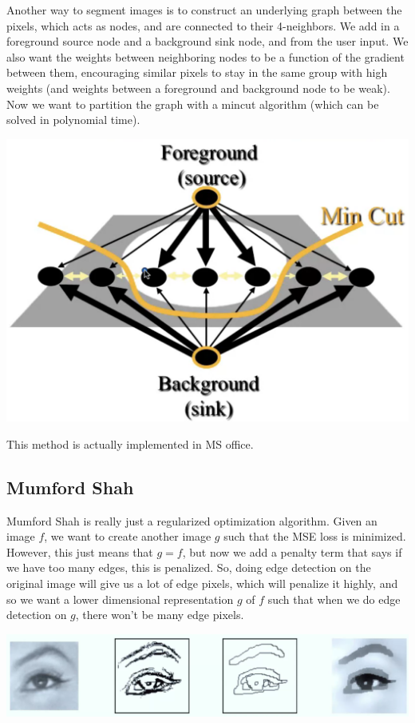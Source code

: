 \documentclass{article}
\begin{document}
    Another way to segment images is to construct an underlying graph between the pixels, which acts as nodes, and are connected to their 4-neighbors. We add in a foreground source node and a background sink node, and from the user input. We also want the weights between neighboring nodes to be a function of the gradient between them, encouraging similar pixels to stay in the same group with high weights (and weights between a foreground and background node to be weak). Now we want to partition the graph with a mincut algorithm (which can be solved in polynomial time). 
    \begin{center}
        \includegraphics[scale=0.3]{img/mincut.png}
    \end{center}
    This method is actually implemented in MS office. 

  \subsection{Mumford Shah}

    Mumford Shah is really just a regularized optimization algorithm. Given an image $f$, we want to create another image $g$ such that the MSE loss is minimized. However, this just means that $g = f$, but now we add a penalty term that says if we have too many edges, this is penalized. So, doing edge detection on the original image will give us a lot of edge pixels, which will penalize it highly, and so we want a lower dimensional representation $g$ of $f$ such that when we do edge detection on $g$, there won't be many edge pixels. 
    \begin{center}
        \includegraphics[scale=0.2]{img/mumfordshah.png}
    \end{center}
\end{document}
